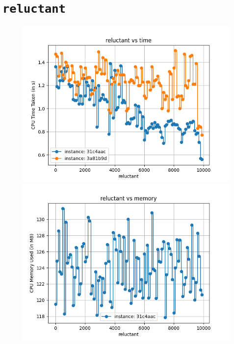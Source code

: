 \documentclass{article}
\begin{document}
    \section*{\texttt{reluctant}}
    \begin{figure}[H]
        \centering
        \begin{minipage}{0.45\textwidth}
            \centering
            \includegraphics[width = \linewidth]{reluctant-0.png}
        \end{minipage}
        \hfill
        \begin{minipage}{0.45\textwidth}
            \centering
            \includegraphics[width = \linewidth]{reluctant-1.png}
        \end{minipage}
    \end{figure}
\end{document}
